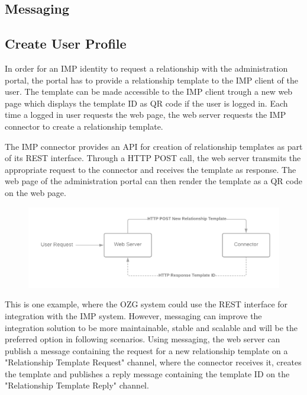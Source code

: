 
\subsection{Messaging}


\subsection{Create User Profile}


In order for an IMP identity to request a relationship with the administration portal, the portal has to provide a relationship template to the IMP client of the user. The template can be made accessible to the IMP client trough a new web page which displays the template ID as QR code if the user is logged in. Each time a logged in user requests the web page, the web server requests the IMP connector to create a relationship template.

The IMP connector provides an API for creation of relationship templates as part of its REST interface. Through a HTTP POST call, the web server transmits the appropriate request to the connector and receives the template as response. The web page of the administration portal can then render the template as a QR code on the web page.

\begin{figure}[h]
    \centering
    \includegraphics[scale=0.3]{Diagrams/Integration Architecture 1/Overview/Relationship Template REST.png}
\end{figure}

This is one example, where the OZG system could use the REST interface for integration with the IMP system. However, messaging can improve the integration solution to be more maintainable, stable and scalable and will be the preferred option in following scenarios. Using messaging, the web server can publish a message containing the request for a new relationship template on a "Relationship Template Request" channel, where the connector receives it, creates the template and publishes a reply message containing the template ID on the "Relationship Template Reply" channel.

